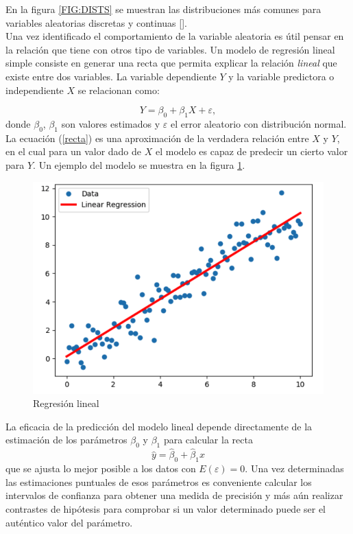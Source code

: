 \noindent En la figura \ref{FIG:DISTS} se muestran las distribuciones más comunes para variables aleatorias discretas y continuas [\cite{bala20}]. \\

\noindent Una vez identificado el comportamiento de la variable aleatoria es útil pensar en la relación que tiene con otros tipo de variables. Un modelo de regresión lineal simple consiste en generar una recta que permita explicar la relación \emph{lineal} que existe entre dos variables. La variable dependiente $Y$ y la variable predictora o independiente $X$ se relacionan como:

\begin{equation}
	Y=\beta_0+\beta_1 X+\varepsilon,
	\label{recta}
\end{equation}
donde $\beta_0$, $\beta_1$ son valores estimados y $\varepsilon$ el error aleatorio con distribución normal. La ecuación (\ref{recta}) es una aproximación de la verdadera relación entre $X$ y $Y$, en el cual para un valor dado de $X$ el modelo es capaz de predecir un cierto valor para $Y$. Un ejemplo del modelo se muestra en la figura \ref{FIG:regresion}.\\

\begin{figure}[H]\centering
		\includegraphics[scale=.3]{ej.png}
		\caption{Regresión lineal}\label{FIG:regresion}
	\end{figure}

\noindent La eficacia de la predicción del modelo lineal depende directamente de la estimaci\'on de los par\'ametros $\beta_0$ y $\beta_1$ para calcular la recta 
\begin{equation}
	\hat{y}=\hat{\beta}_0+\hat{\beta}_1x
\end{equation}
que se ajusta lo mejor posible a los datos con $E(\varepsilon)=0$.  Una vez determinadas las estimaciones puntuales de esos parámetros es conveniente calcular los intervalos de confianza para obtener una medida de precisión y más aún realizar contrastes de hipótesis para comprobar si un valor determinado puede ser el auténtico valor del parámetro.

